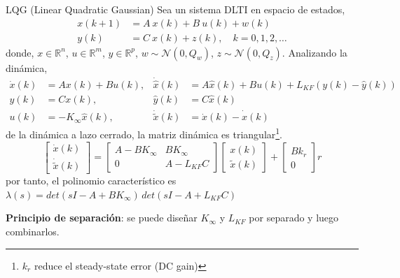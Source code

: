 \documentclass[8pt]{beamer}
\begin{document}
\begin{frame}[fragile]{LQG (Linear Quadratic Gaussian)}
	Sea un sistema DLTI en espacio de estados,
	\begin{equation}
	\begin{aligned}
		x(k+1) & = A~x(k)+B~u(k)+w(k)               \\
		y(k)   & = C~x(k)+z(k), \quad k=0,1,2,\dots
	\end{aligned}
	\end{equation}
	donde, $x\in\mathbb{R}^n$, $u\in\mathbb{R}^m$, $y\in\mathbb{R}^p$, $w\sim\mathcal{N}(0,Q_w)$, $z\sim\mathcal{N}(0,Q_z)$. Analizando la dinámica,
	\begin{equation*}
	\begin{aligned}
		\dot{x}(k) & = A x(k) + B u(k),      & \dot{\hat{x}}(k)   & = A \hat{x}(k) + B u(k) + L_{KF} (y(k)-\hat{y}(k)) &  \\
		y(k)       & = C x(k),               & \hat{y}(k)         & = C \hat{x}(k)                                     &  \\
		u(k)       & = -K_\infty \hat{x}(k), & \dot{\tilde{x}}(k) & = \dot{x}(k)-\dot{\hat{x}}(k)                      &
	\end{aligned}
	\end{equation*}
	de la dinámica a lazo cerrado, la matriz dinámica es triangular\footnote{$k_r$ reduce el steady-state error (DC gain)}.
	\begin{equation*}
		\begin{bmatrix}
			\dot{x}(k)         \\
			\dot{\tilde{x}}(k)
		\end{bmatrix}
		=
		\begin{bmatrix}
			A-B K_\infty & B K_\infty \\
			0            & A-L_{KF} C
		\end{bmatrix}
		\begin{bmatrix}
			x(k)       \\
			\tilde{x}(k)
		\end{bmatrix}
		+
		\begin{bmatrix}
			B k_r \\
			0
		\end{bmatrix}
		r
	\end{equation*}
	por tanto, el polinomio característico es $\lambda(s) = det(sI-A+B K_\infty)\, det(sI-A+L_{KF} C)$	
	\begin{figure}[!ht]
		\centering
		\begin{adjustbox}{max totalsize={1\textwidth}{1\textheight},center}
			
		\end{adjustbox}		
	\end{figure}
	\textbf{Principio de separación}: se puede diseñar $K_\infty$ y $L_{KF}$ por separado y luego combinarlos.
	
\end{frame}
\end{document}

